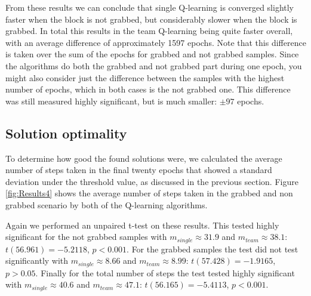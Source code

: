 From these results we can conclude that single Q-learning is converged slightly faster when the block is not grabbed, but considerably slower when the block is grabbed. In total this results in the team Q-learning being quite faster overall, with an average difference of approximately 1597 epochs. Note that this difference is taken over the sum of the epochs for grabbed and not grabbed samples. Since the algorithms do both the grabbed and not grabbed part during one epoch, you might also consider just the difference between the samples with the highest number of epochs, which in both cases is the not grabbed one. This difference was still measured highly significant, but is much smaller: $\pm 97$ epochs.

\subsection{Solution optimality}
To determine how good the found solutions were, we calculated the average number of steps taken in the final twenty epochs that showed a standard deviation under the threshold value, as discussed in the previous section. Figure \ref{fig:Results4} shows the average number of steps taken in the grabbed and non grabbed scenario by both of the Q-learning algorithms.

Again we performed an unpaired t-test on these results. This tested highly significant for the not grabbed samples with $m_{single} \approx 31.9$ and $m_{team} \approx 38.1$: $t(56.961) = -5.2118$, $p < 0.001$. For the grabbed samples the test did not test significantly with $m_{single} \approx 8.66$ and $m_{team} \approx 8.99$: $t(57.428) = -1.9165$, $p > 0.05$. Finally for the total number of steps the test tested highly significant with $m_{single} \approx 40.6$ and $m_{team} \approx 47.1$: $t(56.165) = -5.4113$, $p < 0.001$.

